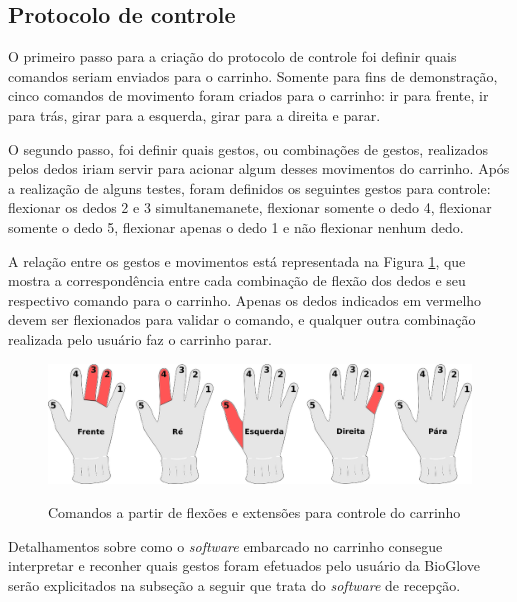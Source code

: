\documentclass[
	12pt,				%
	openright,			%
	oneside,			%
	a4paper,			%
	english,			%
	brazil				%
	]{abntex2}
\begin{document}
				
		\subsection{Protocolo de controle} \label{sub:protocolo-de-controle}

		O primeiro passo para a criação do protocolo de controle foi definir quais comandos seriam enviados para o carrinho. Somente para fins de demonstração, cinco comandos de movimento foram criados para o carrinho: ir para frente, ir para trás, girar para a esquerda, girar para a direita e parar.

		O segundo passo, foi definir quais gestos, ou combinações de gestos, realizados pelos dedos iriam servir para acionar algum desses movimentos do carrinho. Após a realização de alguns testes, foram definidos os seguintes gestos para controle: flexionar os dedos 2 e 3 simultanemanete, flexionar somente o dedo 4, flexionar somente o dedo 5, flexionar apenas o dedo 1 e não flexionar nenhum dedo.

		A relação entre os gestos e movimentos está representada na Figura \ref{Fig:glove-control-positions1}, que mostra a correspondência entre cada combinação de flexão dos dedos e seu respectivo comando para o carrinho. Apenas os dedos indicados em vermelho devem ser flexionados para validar o comando, e qualquer outra combinação realizada pelo usuário faz o carrinho parar.


		\begin{figure}[h!]
			\centering
			\caption{Comandos a partir de flexões e extensões para controle do carrinho}
  		\includegraphics[width=14cm]{./figures/glove-control-positions1.png}
  		\label{Fig:glove-control-positions1}
		\end{figure}

		Detalhamentos sobre como o \textit{software} embarcado no carrinho consegue interpretar e reconher quais gestos foram efetuados pelo usuário da BioGlove serão explicitados na subseção a seguir que trata do \textit{software} de recepção.

\end{document}
